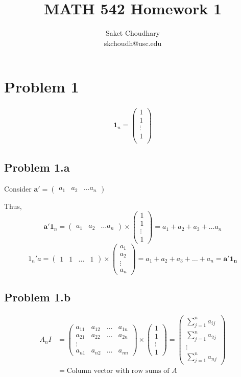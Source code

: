 \documentclass[a4paper]{article}
\title{MATH 542 Homework 1}
\author{Saket Choudhary\\skchoudh@usc.edu}
\begin{document}
\maketitle 
\section*{Problem 1}
\begin{align*}
\mathbf{1}_n = \begin{pmatrix} 1\\
1\\
\vdots\\
1\\
\end{pmatrix}
\end{align*}
\subsection*{Problem 1.a}
Consider $\mathbf{a}' = \begin{pmatrix}a_1 & a_2 & \dots a_n \end{pmatrix}$

Thus, $$\mathbf{a}'\mathbf{1}_n = \begin{pmatrix}a_1 & a_2 & \dots a_n \end{pmatrix} \times \begin{pmatrix} 1\\
1\\
\vdots\\
1\end{pmatrix} = a_1 + a_2 + a_3 + \dots a_n 
$$
$$
1_n'a = \begin{pmatrix} 1 & 1 & \dots & 1 \end{pmatrix} \times \begin{pmatrix} a_1\\
a_2 \\
\vdots \\
a_n
\end{pmatrix} = a_1+a_2+a_3+\dots+a_n =  \mathbf{a'} \mathbf{1_n}
$$
\subsection*{Problem 1.b}
\begin{align*}
A_n I &=  \begin{pmatrix} a_{11} & a_{12} & \dots & a_{1n} \\
a_{21} & a_{22}  & \dots & a_{2n}\\
\vdots\\
a_{n1} & a_{n2} & \dots  & a_{nn}
\end{pmatrix}  \times \begin{pmatrix} 1 \\
1\\
\vdots\\
1
\end{pmatrix} = \begin{pmatrix} \sum_{j=1}^n a_{ij}\\
\sum_{j=1}^n a_{2j}\\
\vdots\\
\sum_{j=1}^n a_{nj}
\end{pmatrix}\\
&= \text{Column vector with row sums of }A
\end{align*}
\end{document}

